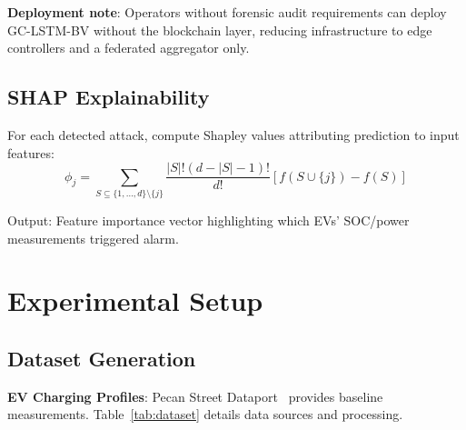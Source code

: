 \documentclass[journal]{IEEEtran}
\begin{document}
\textbf{Deployment note}: Operators without forensic audit requirements can deploy GC-LSTM-BV without the blockchain layer, reducing infrastructure to edge controllers and a federated aggregator only.

\subsection{SHAP Explainability}

For each detected attack, compute Shapley values attributing prediction to input features:
\begin{equation}
\phi_j = \sum_{S \subseteq \{1,\ldots,d\} \setminus \{j\}} \frac{|S|!(d-|S|-1)!}{d!} \left[f(S \cup \{j\}) - f(S)\right]
\end{equation}

Output: Feature importance vector highlighting which EVs' SOC/power measurements triggered alarm.

\section{Experimental Setup}

\subsection{Dataset Generation}

\textbf{EV Charging Profiles}: Pecan Street Dataport~\cite{pecanstreet} provides baseline measurements. Table~\ref{tab:dataset} details data sources and processing.
\end{document}
